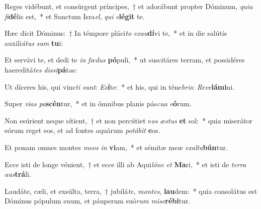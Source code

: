 \item Reges vidébunt, et consúrgent príncipes,~† et adorábunt propter Dóminum, \textit{qui}\textit{a} \textit{fi}\textbf{dé}lis est,~* et Sanctum Isra\textit{el}, \textit{qui} \textit{e}\textbf{lé}\textbf{git} te.
\item Hæc dicit Dóminus:~† In témpore pláci\textit{to} \textit{ex}\textit{au}\textbf{dí}vi te,~* et in die salútis auxili\textit{á}\textit{tus} \textit{sum} \textbf{tu}i:
\item Et servávi te, et dedi te \textit{in} \textit{fœ}\textit{dus} \textbf{pó}puli,~* ut suscitáres terram, et possidéres haereditá\textit{tes} \textit{dis}\textit{si}\textbf{pá}tas:
\item Ut díceres his, qui vinc\textit{ti} \textit{sunt}: \textit{Ex}\textbf{í}te:~* et his, qui in téne\textit{bris}: \textit{Re}\textit{ve}\textbf{lá}\textbf{mi}ni.
\item Super \textit{vi}\textit{as} \textit{pa}\textbf{scén}tur,~* et in ómnibus planis pás\textit{cu}\textit{a} \textit{e}\textbf{ó}rum.
\item Non esúrient neque sítient,~† et non percútiet e\textit{os} \textit{æs}\textit{tus} \textbf{et} sol:~* quia miserátor eórum reget eos, et ad fontes aquárum \textit{po}\textit{tá}\textit{bit} \textbf{e}os.
\item Et ponam omnes montes \textit{me}\textit{os} \textit{in} \textbf{vi}am,~* et sémitæ meæ \textit{ex}\textit{al}\textit{ta}\textbf{bún}tur.
\item Ecce isti de longe vénient,~† et ecce illi ab Aqui\textit{ló}\textit{ne} \textit{et} \textbf{Ma}ri,~* et isti de \textit{ter}\textit{ra} \textit{aus}\textbf{trá}li.
\item Laudáte, cæli, et exsúlta, terra,~† jubilá\textit{te}, \textit{mon}\textit{tes}, \textbf{lau}dem:~* quia consolátus est Dóminus pópulum suum, et páuperum suó\textit{rum} \textit{mi}\textit{se}\textbf{ré}\textbf{bi}tur.
